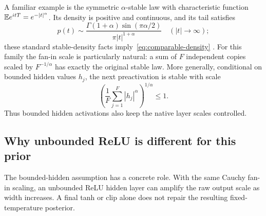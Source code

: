 A familiar example is the symmetric $\alpha$-stable law with characteristic function $\mathbb E e^{itT}=e^{-|t|^\alpha}$. Its density is positive and continuous, and its tail satisfies
\[
 p(t)\sim\frac{\Gamma(1+\alpha)\sin(\pi\alpha/2)}{\pi|t|^{1+\alpha}}
 \quad(|t|\longrightarrow\infty);
\]
these standard stable-density facts imply~\eqref{eq:comparable-density} \cite{zolotarev}.
For this family the fan-in scale is particularly natural: a sum of $F$ independent copies scaled by $F^{-1/\alpha}$ has exactly the original stable law. More generally, conditional on bounded hidden values $h_j$, the next preactivation is stable with scale
\[
 \left(\frac1F\sum_{j=1}^F|h_j|^\alpha\right)^{1/\alpha}\le1.
\]
Thus bounded hidden activations also keep the native layer scales controlled.



\subsection{Why unbounded ReLU is different for this prior}
The bounded-hidden assumption has a concrete role. With the same Cauchy fan-in scaling, an unbounded ReLU hidden layer can amplify the raw output scale as width increases. A final tanh or clip alone does not repair the resulting fixed-temperature posterior.

